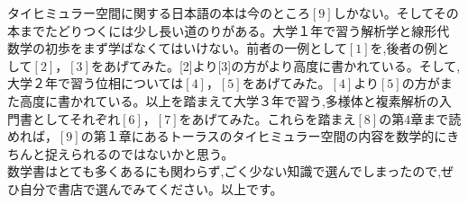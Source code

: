 タイヒミュラー空間に関する日本語の本は今のところ$[9]$しかない。そしてその本までたどりつくには少し長い道のりがある。大学１年で習う解析学と線形代数学の初歩をまず学ばなくてはいけない。前者の一例として$[1]$を,後者の例として$[2]，[3]$をあげてみた。[2]より[3]の方がより高度に書かれている。そして,大学２年で習う位相については$[4]，[5]$をあげてみた。$[4]$より$[5]$の方がまた高度に書かれている。以上を踏まえて大学３年で習う,多様体と複素解析の入門書としてそれぞれ$[6]，[7]$をあげてみた。これらを踏まえ$[8]$の第$4$章まで読めれば，$[9]$の第１章にあるトーラスのタイヒミュラー空間の内容を数学的にきちんと捉えられるのではないかと思う。\\
数学書はとても多くあるにも関わらず,ごく少ない知識で選んでしまったので,ぜひ自分で書店で選んでみてください。以上です。







